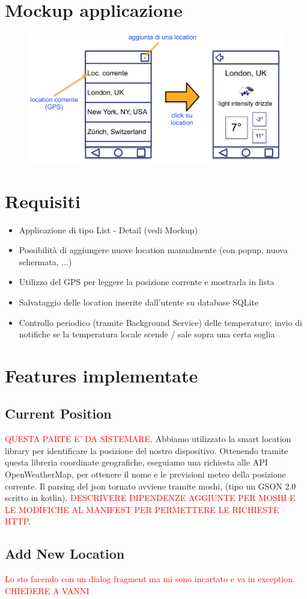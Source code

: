 \documentclass{article}
\begin{document}
\section{Mockup applicazione}
\begin{figure}[H]
    \center
    \includegraphics[scale=0.25]{images/fig3.png}
\end{figure}
\section{Requisiti}
\begin{itemize}
    \item Applicazione di tipo List - Detail (vedi Mockup)
    \item Possibilità di aggiungere nuove location manualmente (con popup, nuova
schermata, ...)
    \item Utilizzo del GPS per leggere la posizione corrente e mostrarla in lista
    \item Salvataggio delle location inserite dall'utente su database SQLite
    \item Controllo periodico (tramite Background Service) delle temperature; invio di
notifiche se la temperatura locale scende / sale sopra una certa soglia
\end{itemize}
\section{Features implementate}
\subsection{Current Position}
\textcolor{red}{QUESTA PARTE E' DA SISTEMARE}.
Abbiamo utilizzato la smart location library per identificare la posizione del nostro dispositivo.
Ottenendo tramite questa libreria coordinate geografiche, eseguiamo una richiesta alle API
OpenWeatherMap, per ottenere il nome e le previsioni meteo della posizione corrente.
Il parsing del json tornato avviene tramite moshi, (tipo un GSON 2.0 scritto in kotlin).
\textcolor{red}{DESCRIVERE DIPENDENZE AGGIUNTE PER MOSHI E LE MODIFICHE AL MANIFEST PER PERMETTERE LE RICHIESTE HTTP}.
\subsection{Add New Location}
\textcolor{red}{Lo sto facendo con un dialog fragment ma mi sono incartato e va in exception. CHIEDERE A VANNI}
\end{document}
